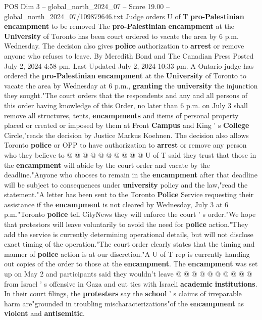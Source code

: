 \begin{textsample}{POS Dim 3 – global\_north\_2024\_07 – Score 19.00 – global\_north\_2024\_07/109879646.txt}  \label{ex:f3_pos_088}
Judge orders U of T \textbf{pro-Palestinian} \textbf{encampment} to be removed The \textbf{pro-Palestinian} \textbf{encampment} at the \textbf{University} of Toronto has been court ordered to vacate the area by 6 p.m.
Wednesday.
The decision also gives \textbf{police} authorization to \textbf{arrest} or remove anyone who refuses to leave.
By Meredith Bond and The Canadian Press Posted July 2, 2024 4:58 pm.
Last Updated July 2, 2024 10:33 pm.
A Ontario judge has ordered the \textbf{pro-Palestinian} \textbf{encampment} at the \textbf{University} of Toronto to vacate the area by Wednesday at 6 p.m., \textbf{granting} the \textbf{university} the injunction they sought."The court orders that the respondents and any and all persons of this order having knowledge of this Order, no later than 6 p.m. on July 3 shall remove all structures, tents, \textbf{encampments} and items of personal property placed or created or imposed by them at Front \textbf{Campus} and King ' s \textbf{College} Circle,"reads the decision by Justice Markus Koehnen.
The decision also allows Toronto \textbf{police} or OPP to have authorization to \textbf{arrest} or remove any person who they believe to @ @ @ @ @ @ @ @ @ @ U of T said they trust that those in the \textbf{encampment} will abide by the court order and vacate by the deadline."Anyone who chooses to remain in the \textbf{encampment} after that deadline will be subject to consequences under \textbf{university} policy and the law,"read the statement."A letter has been sent to the Toronto \textbf{Police} Service requesting their assistance if the \textbf{encampment} is not cleared by Wednesday, July 3 at 6 p.m."Toronto \textbf{police} tell CityNews they will enforce the court ' s order."We hope that protestors will leave voluntarily to avoid the need for \textbf{police} action."They add the service is currently determining operational details, but will not disclose exact timing of the operation."The court order clearly states that the timing and manner of \textbf{police} action is at our discretion."A U of T rep is currently handing out copies of the order to those at the \textbf{encampment}.
The \textbf{encampment} was set up on May 2 and participants said they wouldn't leave @ @ @ @ @ @ @ @ @ @ from Israel ' s offensive in Gaza and cut ties with Israeli \textbf{academic} \textbf{institutions}.
In their court filings, the \textbf{protesters} say the \textbf{school} ' s claims of irreparable harm are"grounded in troubling mischaracterizations"of the \textbf{encampment} as \textbf{violent} and \textbf{antisemitic}.

\end{textsample}
